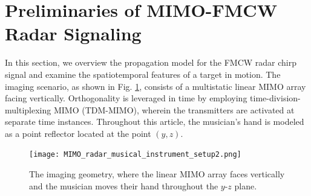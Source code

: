 \documentclass[10pt,journal,final]{IEEEtran}
\begin{document}



\section{Preliminaries of MIMO-FMCW Radar Signaling}
\label{sec:radar_theory_for_musicians}
In this section, we overview the propagation model for the FMCW radar chirp signal and examine the spatiotemporal features of a target in motion. 
The imaging scenario, as shown in Fig. \ref{fig:MIMO_radar_musical_instrument_setup}, consists of a multistatic linear MIMO array facing vertically. 
Orthogonality is leveraged in time by employing time-division-multiplexing MIMO (TDM-MIMO), wherein the transmitters are activated at separate time instances.
Throughout this article, the musician's hand is modeled as a point reflector located at the point $(y,z)$.

\begin{figure}[h]
	\centering
	\texttt{[image: MIMO\_radar\_musical\_instrument\_setup2.png]}
	\caption{The imaging geometry, where the linear MIMO array faces vertically and the musician moves their hand throughout the $y$-$z$ plane.}
	\label{fig:MIMO_radar_musical_instrument_setup}
\end{figure} 
\end{document}
